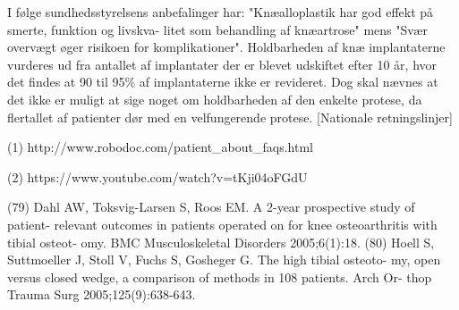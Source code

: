 I følge sundhedsstyrelsens anbefalinger har: "Knæalloplastik har god effekt på smerte, funktion og livskva- litet som behandling af knæartrose" mens "Svær overvægt øger risikoen for komplikationer". Holdbarheden af knæ implantaterne vurderes ud fra antallet af implantater der er blevet udskiftet efter 10 år, hvor det findes at 90 til 95\% af implantaterne ikke er revideret. Dog skal nævnes at det ikke er muligt at sige noget om holdbarheden af den enkelte protese, da flertallet af patienter dør med en velfungerende protese. [Nationale retningslinjer]

(1) http://www.robodoc.com/patient_about_faqs.html

(2) https://www.youtube.com/watch?v=tKji04oFGdU

(79) Dahl AW, Toksvig-Larsen S, Roos EM. A 2-year prospective study of patient- relevant outcomes in patients operated on for knee osteoarthritis with tibial osteot- omy. BMC Musculoskeletal Disorders 2005;6(1):18.
(80) Hoell S, Suttmoeller J, Stoll V, Fuchs S, Gosheger G. The high tibial osteoto- my, open versus closed wedge, a comparison of methods in 108 patients. Arch Or- thop Trauma Surg 2005;125(9):638-643.